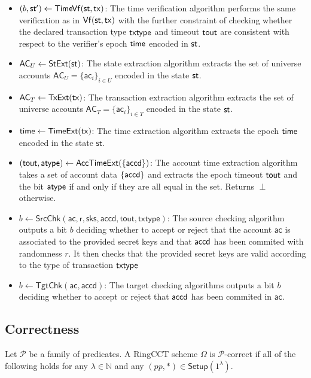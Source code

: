 \begin{definition}
\begin{itemize}
        \item $(b,\mathsf{st}') \gets \mathsf{TimeVf}(\st,\tx)$: The time verification algorithm performs the same verification as in $\mathsf{Vf}(\st, \tx)$ with the further constraint of checking whether the declared transaction type $\mathsf{txtype}$ and timeout $\mathsf{tout}$ are consistent with respect to the verifier's epoch $\mathsf{time}$ encoded in $\st$.
        \item $\mathsf{AC}_U \gets \mathsf{StExt}(\st)$: The state extraction algorithm
        extracts the set of universe accounts $\mathsf{AC}_U = \{\mathsf{ac}_i\}_{i \in U}$ encoded in the state $\st$.
        \item $\mathsf{AC}_T \gets \mathsf{TxExt}(\mathsf{tx})$: The transaction extraction algorithm
        extracts the set of universe accounts $\mathsf{AC}_T = \{\mathsf{ac}_i\}_{i \in T}$ encoded in the state $\st$.
        \item $\mathsf{time} \gets \mathsf{TimeExt}(\mathsf{tx})$: The time extraction algorithm
        extracts the epoch $\mathsf{time}$ encoded in the state $\mathsf{st}$.
        \item $(\mathsf{tout}, \mathsf{atype}) \gets \mathsf{AccTimeExt}(\{\mathsf{accd}\})$: The account time extraction algorithm takes a set of account data $\{\mathsf{accd}\}$ and extracts the epoch timeout $\mathsf{tout}$ and the bit $\mathsf{atype}$ if and only if they are all equal in the set. Returns $\perp$ otherwise.
        \item $b \gets \mathsf{SrcChk}(\mathsf{ac,r,sks,accd,tout,txtype})$: The source checking algorithm outputs a bit $b$ deciding whether to accept or reject that the account $\mathsf{ac}$ is associated to the provided secret keys and that $\mathsf{accd}$ has been commited with randomness $r$. It then checks that the provided secret keys are valid according to the type of transaction $\mathsf{txtype}$
        \item $b \gets \mathsf{TgtChk}(\mathsf{ac,accd})$: The target checking algorithms outputs a bit $b$ deciding whether to accept or reject that $\mathsf{accd}$ has been commited in $\mathsf{ac}$. 
    \end{itemize}
\end{definition}

\subsection{Correctness}
\begin{definition}[Correctness] 
    Let $\mathcal{P}$ be a family of predicates. A RingCCT scheme $\Omega$ is $\mathcal{P}$-correct if all of the following holds for any $\lambda \in \mathbb{N}$ and any $(pp, *) \in \mathsf{Setup}(1^\lambda)$.
\end{definition}

